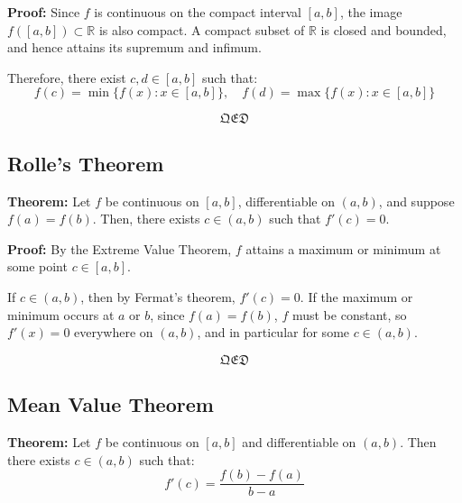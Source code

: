 \textbf{Proof:}  
Since \( f \) is continuous on the compact interval \([a, b]\), the image \( f([a, b]) \subset \mathbb{R} \) is also compact. A compact subset of \( \mathbb{R} \) is closed and bounded, and hence attains its supremum and infimum.

Therefore, there exist \( c, d \in [a, b] \) such that:
\[
f(c) = \min\{f(x): x \in [a, b]\}, \quad
f(d) = \max\{f(x): x \in [a, b]\}
\]

\[\mathfrak{QED}\]


\subsection{Rolle’s Theorem}

\textbf{Theorem:}  
Let \( f \) be continuous on \([a, b] \), differentiable on \((a, b) \), and suppose \( f(a) = f(b) \).  
Then, there exists \( c \in (a, b) \) such that \( f'(c) = 0 \).

\textbf{Proof:}  
By the Extreme Value Theorem, \( f \) attains a maximum or minimum at some point \( c \in [a, b] \).

If \( c \in (a, b) \), then by Fermat’s theorem, \( f'(c) = 0 \).  
If the maximum or minimum occurs at \( a \) or \( b \), since \( f(a) = f(b) \), \( f \) must be constant, so \( f'(x) = 0 \) everywhere on \((a, b)\), and in particular for some \( c \in (a, b) \).

\[\mathfrak{QED}\]

\begin{center}
\end{center}



\subsection{Mean Value Theorem}

\textbf{Theorem:}  
Let \( f \) be continuous on \([a, b] \) and differentiable on \((a, b) \).  
Then there exists \( c \in (a, b) \) such that:
\[
f'(c) = \frac{f(b) - f(a)}{b - a}
\]

